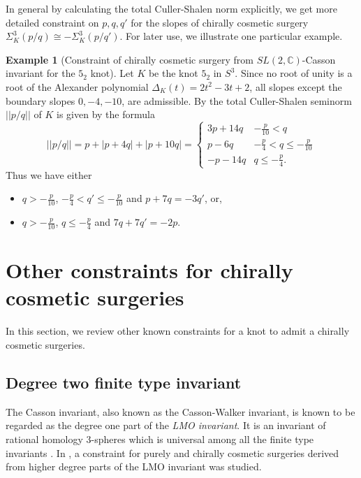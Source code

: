 \documentclass{amsart}
\theoremstyle{remark}
\theoremstyle{definition}
\newtheorem{example}{Example}[section]
\begin{document}
In general by calculating the total Culler-Shalen norm explicitly, we get more detailed constraint on $p,q,q'$ for the slopes of chirally cosmetic surgery $\Sigma^{3}_K(p/q) \cong -\Sigma^{3}_K(p/q')$. For later use, we illustrate one particular example.

\begin{example}[Constraint of chirally cosmetic surgery from $SL (2, \mathbb{C})$-Casson invariant for the $5_2$ knot]
\label{exam:5_2}
Let $K$ be the knot $5_2$ in $S^{3}$. 
Since no root of unity is a root of the Alexander polynomial $\Delta_K(t)=2t^{2}-3t+2$, all slopes except the boundary slopes $0,-4,-10$, are admissible. By \cite{BodenCurtis} the total Culler-Shalen seminorm $||p/q||$ of $K$ is given by the formula
\[ 
||p/q||=p+|p+4q|+|p+10q| = \begin{cases}
3p+14q & -\frac{p}{10}<q \\
p-6q    &  -\frac{p}{4} <q \leq -\frac{p}{10}\\
-p-14q & q\leq -\frac{p}{4}.
\end{cases} 
\]
Thus we have either
\begin{itemize}
\item $q>-\frac{p}{10}$, $-\frac{p}{4} <q' \leq -\frac{p}{10}$ and $p+7q=-3q'$, or,
\item $q>-\frac{p}{10}$, $q\leq -\frac{p}{4}$ and $7q+7q'=-2p$. 
\end{itemize}
\end{example}








\section{Other constraints for chirally cosmetic surgeries}
\label{section:others}
In this section, we review other known constraints for a knot to admit a chirally cosmetic surgeries.

\subsection{Degree two finite type invariant}

The Casson invariant, also known as the Casson-Walker invariant, is known to be regarded as the degree one part of the \textit{LMO invariant}. 
It is an invariant of rational homology 3-spheres which is universal among all the finite type invariants \cite{LeMurakamiOhtsuki}. 
In \cite{ItoTetsuya}, a constraint for purely and chirally cosmetic surgeries derived from higher degree parts of the LMO invariant was studied. 
\end{document}
